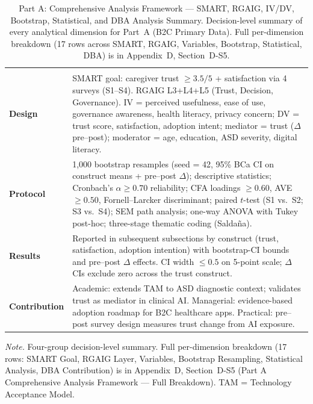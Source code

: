 {\tablestripes\tablefontsize
\begin{xltabular}{\textwidth}{@{} >{\raggedright\arraybackslash}p{2.5cm} L @{}}
\caption[Part A: Comprehensive Analysis Framework --- SMART,]{Part A: Comprehensive Analysis Framework --- SMART, RGAIG, IV/DV, Bootstrap, Statistical, and DBA Analysis Summary. Decision-level summary of every analytical dimension for Part~A (B2C Primary Data). Full per-dimension breakdown (17 rows across SMART, RGAIG, Variables, Bootstrap, Statistical, DBA) is in Appendix~D, Section~D-S5.}\label{tab:ch4_parta_comprehensive} \\
\toprule
{} &  \\
\midrule
\endfirsthead
\toprule
{} &  \\
\midrule
\endhead
\bottomrule
\endlastfoot
\textbf{Design} & SMART goal: caregiver trust $\geq 3.5/5$ + satisfaction via 4 surveys (S1--S4). RGAIG L3+L4+L5 (Trust, Decision, Governance). IV = perceived usefulness, ease of use, governance awareness, health literacy, privacy concern; DV = trust score, satisfaction, adoption intent; mediator = trust ($\Delta$ pre--post); moderator = age, education, ASD severity, digital literacy. \\
\addlinespace
\textbf{Protocol} & 1,000 bootstrap resamples (seed = 42, 95\% BCa CI on construct means + pre--post $\Delta$); descriptive statistics; Cronbach's $\alpha \geq 0.70$ reliability; CFA loadings $\geq 0.60$, AVE $\geq 0.50$, Fornell--Larcker discriminant; paired $t$-test (S1 vs.\ S2; S3 vs.\ S4); SEM path analysis; one-way ANOVA with Tukey post-hoc; three-stage thematic coding (Salda\~{n}a). \\
\addlinespace
\textbf{Results} & Reported in subsequent subsections by construct (trust, satisfaction, adoption intention) with bootstrap-CI bounds and pre--post $\Delta$ effects. CI width $\leq 0.5$ on 5-point scale; $\Delta$ CIs exclude zero across the trust construct. \\
\addlinespace
\textbf{Contribution} & Academic: extends TAM to ASD diagnostic context; validates trust as mediator in clinical AI. Managerial: evidence-based adoption roadmap for B2C healthcare apps. Practical: pre--post survey design measures trust change from AI exposure. \\
\end{xltabular}}
\vspace{0.4em}
\noindent\textit{Note.} Four-group decision-level summary. Full per-dimension breakdown (17 rows: SMART Goal, RGAIG Layer, Variables, Bootstrap Resampling, Statistical Analysis, DBA Contribution) is in Appendix~D, Section~D-S5 (Part A Comprehensive Analysis Framework --- Full Breakdown). TAM = Technology Acceptance Model.

